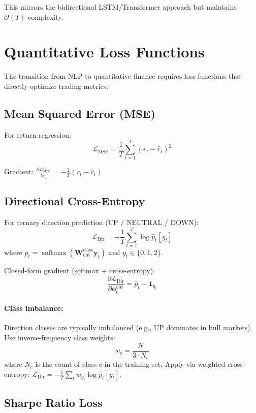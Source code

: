 \documentclass[11pt,a4paper]{article}
\newcommand{\softmax}{\operatorname{softmax}}
\newcommand{\loss}{\mathcal{L}}
\begin{document}
This mirrors the bidirectional LSTM/Transformer approach but maintains
$\mathcal{O}(T)$ complexity.

\section{Quantitative Loss Functions}

The transition from NLP to quantitative finance requires loss functions that
directly optimize trading metrics.

\subsection{Mean Squared Error (MSE)}

For return regression:
\[
\loss_{\text{MSE}} = \frac{1}{T} \sum_{t=1}^{T} (r_t - \hat{r}_t)^2
\]

Gradient: $\frac{\partial \loss_{\text{MSE}}}{\partial \hat{r}_t} = -\frac{2}{T}(r_t - \hat{r}_t)$

\subsection{Directional Cross-Entropy}

For ternary direction prediction (UP / NEUTRAL / DOWN):
\[
\loss_{\text{Dir}} = -\frac{1}{T} \sum_{t=1}^{T} \log \hat{p}_t[y_t]
\]
where $\hat{p}_t = \softmax(\mathbf{W}_{\text{out}}^{\text{class}} \mathbf{y}_t)$
and $y_t \in \{0, 1, 2\}$.

Closed-form gradient (softmax + cross-entropy):
\[
\frac{\partial \loss_{\text{Dir}}}{\partial \mathbf{o}_t^{\text{out}}} = \hat{p}_t - \mathbf{1}_{y_t}
\]

\paragraph{Class imbalance:} Direction classes are typically imbalanced (e.g.,
UP dominates in bull markets). Use inverse-frequency class weights:
\[
w_c = \frac{N}{3 \cdot N_c}
\]
where $N_c$ is the count of class $c$ in the training set. Apply via
weighted cross-entropy: $\loss_{\text{Dir}} = -\frac{1}{T}\sum_t w_{y_t}
\log \hat{p}_t[y_t]$.

\subsection{Sharpe Ratio Loss}
\end{document}
